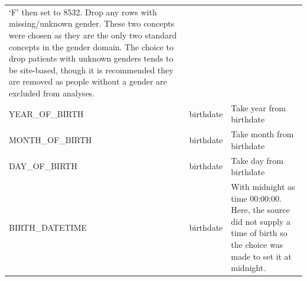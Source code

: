 \documentclass[10.5pt]{book}
\theoremstyle{definition}
\theoremstyle{definition}
\theoremstyle{definition}
\theoremstyle{remark}
\begin{document}
\begin{longtable}[]{@{}lll@{}}
\begin{minipage}[t]{0.50\columnwidth}
`F' then set to 8532. Drop any rows with missing/unknown gender. These
two concepts were chosen as they are the only two standard concepts in
the gender domain. The choice to drop patients with unknown genders
tends to be site-based, though it is recommended they are removed as
people without a gender are excluded from analyses.\strut
\end{minipage}\tabularnewline
\begin{minipage}[t]{0.28\columnwidth}\raggedright\strut
YEAR\_OF\_BIRTH\strut
\end{minipage} & \begin{minipage}[t]{0.13\columnwidth}\raggedright\strut
birthdate\strut
\end{minipage} & \begin{minipage}[t]{0.50\columnwidth}\raggedright\strut
Take year from birthdate\strut
\end{minipage}\tabularnewline
\begin{minipage}[t]{0.28\columnwidth}\raggedright\strut
MONTH\_OF\_BIRTH\strut
\end{minipage} & \begin{minipage}[t]{0.13\columnwidth}\raggedright\strut
birthdate\strut
\end{minipage} & \begin{minipage}[t]{0.50\columnwidth}\raggedright\strut
Take month from birthdate\strut
\end{minipage}\tabularnewline
\begin{minipage}[t]{0.28\columnwidth}\raggedright\strut
DAY\_OF\_BIRTH\strut
\end{minipage} & \begin{minipage}[t]{0.13\columnwidth}\raggedright\strut
birthdate\strut
\end{minipage} & \begin{minipage}[t]{0.50\columnwidth}\raggedright\strut
Take day from birthdate\strut
\end{minipage}\tabularnewline
\begin{minipage}[t]{0.28\columnwidth}\raggedright\strut
BIRTH\_DATETIME\strut
\end{minipage} & \begin{minipage}[t]{0.13\columnwidth}\raggedright\strut
birthdate\strut
\end{minipage} & \begin{minipage}[t]{0.50\columnwidth}\raggedright\strut
With midnight as time 00:00:00. Here, the source did not supply a time
of birth so the choice was made to set it at midnight.\strut

\end{minipage}
\end{longtable}
\end{document}
